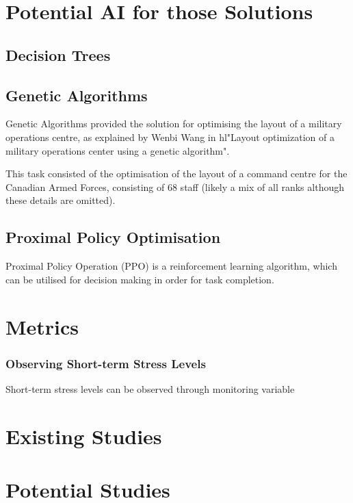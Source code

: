\documentclass{article}
\begin{document}
\section{Potential AI for those Solutions}

\subsection{Decision Trees}

\subsection{Genetic Algorithms}

Genetic Algorithms provided the solution for optimising the layout of a military operations centre, as explained by Wenbi Wang in hl{"Layout optimization of a military operations center using a genetic algorithm".}

This task consisted of the optimisation of the layout of a command centre for the Canadian Armed Forces, consisting of 68 staff (likely a mix of all ranks although these details are omitted).

\subsection{Proximal Policy Optimisation}

Proximal Policy Operation (PPO) is a reinforcement learning algorithm, which can be utilised for decision making in order for task completion. \cite{schulman2017proximal}

\section{Metrics}

\subsubsection{Observing Short-term Stress Levels}

Short-term stress levels can be observed through monitoring variable 

\section{Existing Studies}


\section{Potential Studies}
\end{document}
